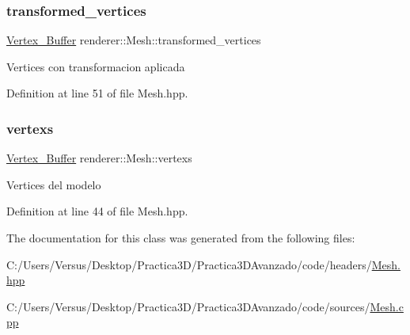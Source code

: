 \subsubsection{\texorpdfstring{transformed\_vertices}{transformed\_vertices}}
{\footnotesize\ttfamily \mbox{\hyperlink{classrenderer_1_1_mesh_a8c848a95f65fb25f6dc94dcb8879cf8b}{Vertex\+\_\+\+Buffer}} renderer\+::\+Mesh\+::transformed\+\_\+vertices\hspace{0.3cm}{\ttfamily [private]}}

Vertices con transformacion aplicada 

Definition at line 51 of file Mesh.\+hpp.

\mbox{\label{classrenderer_1_1_mesh_a09d0844ff04aec6c504b44c261cf81e1}} 
\subsubsection{\texorpdfstring{vertexs}{vertexs}}
{\footnotesize\ttfamily \mbox{\hyperlink{classrenderer_1_1_mesh_a8c848a95f65fb25f6dc94dcb8879cf8b}{Vertex\+\_\+\+Buffer}} renderer\+::\+Mesh\+::vertexs\hspace{0.3cm}{\ttfamily [private]}}

Vertices del modelo 

Definition at line 44 of file Mesh.\+hpp.



The documentation for this class was generated from the following files\+:\begin{DoxyCompactItemize}
\item 
C\+:/\+Users/\+Versus/\+Desktop/\+Practica3\+D/\+Practica3\+D\+Avanzado/code/headers/\mbox{\hyperlink{_mesh_8hpp}{Mesh.\+hpp}}\item 
C\+:/\+Users/\+Versus/\+Desktop/\+Practica3\+D/\+Practica3\+D\+Avanzado/code/sources/\mbox{\hyperlink{_mesh_8cpp}{Mesh.\+cpp}}\end{DoxyCompactItemize}
